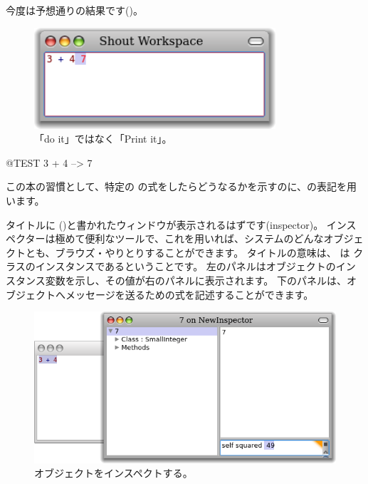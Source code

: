 \documentclass[a4paper,10pt,twoside]{book}
\begin{document}
今度は予想通りの結果です()。

\begin{figure}[htb]
\centerline {\includegraphics[width=0.8\textwidth]{PrintIt}}
\caption{「do it」ではなく「Print it」。}
\end{figure}

\begin{code}{@TEST}
3 + 4 --> 7
\end{code}
\noindent
この本の習慣として、特定の \pharo の式をしたらどうなるかを示すのに、\ct{-->}の表記を用います。

\noindent
タイトルに ()と書かれたウィンドウが表示されるはずです(inspector)。
インスペクターは極めて便利なツールで、これを用いれば、システムのどんなオブジェクトとも、ブラウズ・やりとりすることができます。
タイトルの意味は、 は  クラスのインスタンスであるということです。
左のパネルはオブジェクトのインスタンス変数を示し、その値が右のパネルに表示されます。
下のパネルは、オブジェクトへメッセージを送るための式を記述することができます。

\begin{figure}[htb]
\centerline {\includegraphics[width=\textwidth]{InspectIt}}
\caption{オブジェクトをインスペクトする。}
\end{figure}
\end{document}

